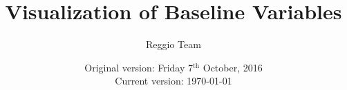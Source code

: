 




\title{Visualization of Baseline Variables}
\author{Reggio Team}
\date{Original version: Friday 7$^{\text{th}}$ October, 2016 \\ Current version: \today}
\maketitle

\tableofcontents

\doublespacing







